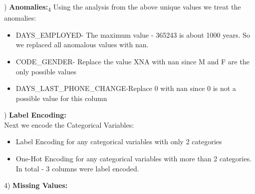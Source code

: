 \documentclass[fleqn,10pt]{SelfArx} %
\begin{document}
) \textbf{Anomalies:}\textsubscript{4}
Using the analysis from the above unique values we treat the anomalies:\\
\begin{itemize}
	\item DAYS_EMPLOYED- The maximum value - 365243 is about 1000 years. So we replaced all anomalous values with nan.
	\item CODE_GENDER- Replace the value XNA with nan since M and F are the only possible values
	\item DAYS_LAST_PHONE_CHANGE-Replace 0 with nan since 0 is not a possible value for this column
\end{itemize}

)  \textbf{Label Encoding:}\\

\noindent
Next we encode the Categorical Variables:\\
\begin{itemize}
	\item Label Encoding for any categorical variables with only 2 categories
	\item One-Hot Encoding for any categorical variables with more than 2 categories. In total - 3 columns were label encoded. 
	
\end{itemize}
4) \textbf{Missing Values:} \\
\end{document}
